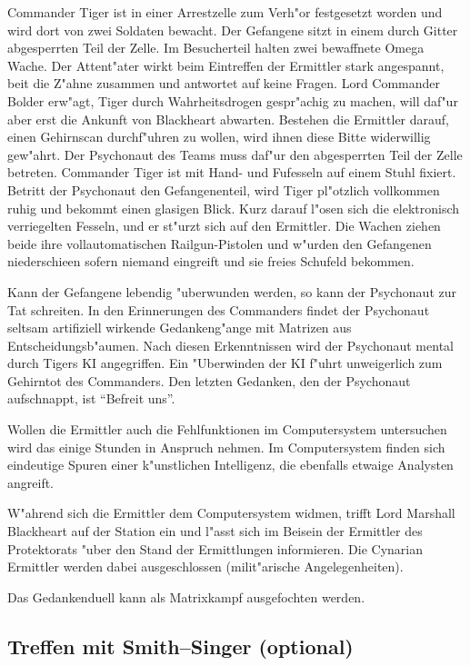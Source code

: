 Commander Tiger ist in einer Arrestzelle zum Verh"or festgesetzt worden und wird dort von zwei Soldaten bewacht. Der Gefangene sitzt in einem durch Gitter abgesperrten Teil der Zelle. Im Besucherteil halten zwei bewaffnete Omega Wache. Der Attent"ater wirkt beim Eintreffen der Ermittler stark angespannt, bei\3t die Z"ahne zusammen und antwortet auf keine Fragen. Lord Commander Bolder erw"agt, Tiger durch Wahrheitsdrogen gespr"achig zu machen, will daf"ur aber erst die Ankunft von Blackheart abwarten. Bestehen die Ermittler darauf, einen Gehirnscan durchf"uhren zu wollen, wird ihnen diese Bitte widerwillig gew"ahrt. Der Psychonaut des Teams muss daf"ur den abgesperrten Teil der Zelle betreten. Commander Tiger ist mit Hand- und Fu\3fesseln auf einem Stuhl fixiert. Betritt der Psychonaut den Gefangenenteil, wird Tiger pl"otzlich vollkommen ruhig und bekommt einen glasigen Blick. Kurz darauf l"osen sich die elektronisch verriegelten Fesseln, und er st"urzt sich auf den Ermittler. Die Wachen ziehen beide ihre vollautomatischen Railgun-Pistolen und w"urden den Gefangenen niederschie\3en sofern niemand eingreift und sie freies Schu\3feld bekommen.

Kann der Gefangene lebendig "uberwunden werden, so kann der Psychonaut zur Tat schreiten. In den Erinnerungen des Commanders findet der Psychonaut seltsam artifiziell wirkende Gedankeng"ange mit Matrizen aus Entscheidungsb"aumen. Nach diesen Erkenntnissen wird der Psychonaut mental durch Tigers KI angegriffen. Ein "Uberwinden der KI f"uhrt unweigerlich zum Gehirntot des Commanders. Den letzten Gedanken, den der Psychonaut aufschnappt, ist "`Befreit uns"'.

Wollen die Ermittler auch die Fehlfunktionen im Computersystem untersuchen wird das einige Stunden in Anspruch nehmen. Im Computersystem finden sich eindeutige Spuren einer k"unstlichen Intelligenz, die ebenfalls etwaige Analysten angreift.

W"ahrend sich die Ermittler dem Computersystem widmen, trifft Lord Marshall Blackheart auf der Station ein und l"asst sich im Beisein der Ermittler des Protektorats "uber den Stand der Ermittlungen informieren. Die Cynarian Ermittler werden dabei ausgeschlossen (milit"arische Angelegenheiten).

\begin{remarks}
	Das Gedankenduell kann als Matrixkampf ausgefochten werden.
\end{remarks}

\subsection{Treffen mit Smith--Singer (optional)}

